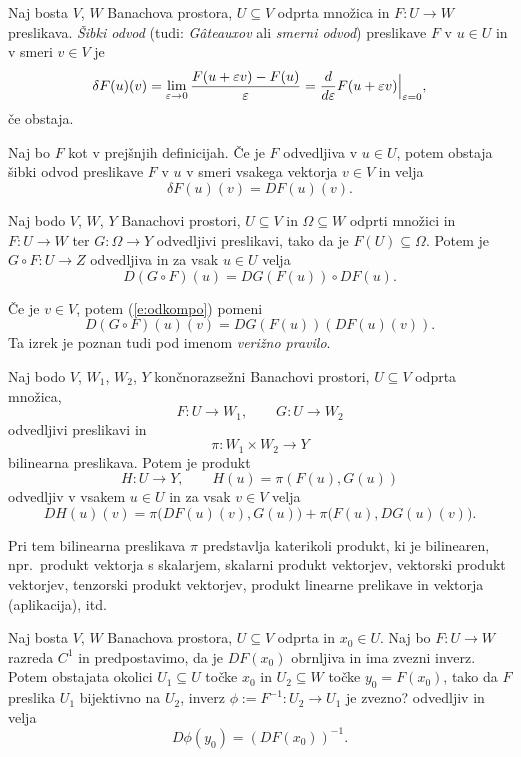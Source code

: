 \begin{definicija}
	Naj bosta $V$, $W$ Banachova prostora, $U\subseteq V$ odprta
	množica in $F\colon U\to W$ preslikava. \emph{Šibki odvod} (tudi: \emph{Gâteauxov} ali
	\emph{smerni odvod}) preslikave $F$ v $u\in U$ in v smeri $v\in V$ je
	\[
		\delta F(u)(v) =
		\lim_{\varepsilon\to 0}\frac{F(u+\varepsilon v)-F(u)}{\varepsilon}
		=\frac{d}{d\varepsilon}F(u+\varepsilon v)\Big|_{\varepsilon = 0},
	\]
	če obstaja.
\end{definicija}

\begin{trditev}
	Naj bo $F$ kot v prejšnjih definicijah. Če je $F$ odvedljiva v $u\in U$,
	potem obstaja šibki odvod preslikave $F$ v $u$ v smeri vsakega vektorja $v\in V$
	in velja
	\[
		\delta F(u)(v)=DF(u)(v).
	\]
\end{trditev}

\begin{izrek}
	Naj bodo $V$, $W$, $Y$ Banachovi prostori, $U\subseteq V$ in $\Omega\subseteq W$ odprti
	množici in $F\colon U\to W$ ter $G\colon\Omega\to Y$ odvedljivi preslikavi,
	tako da je $F(U)\subseteq\Omega$.
	Potem je $G\circ F\colon U\to Z$ odvedljiva in za vsak $u\in U$ velja
	\begin{equation} \label{e:odkompo}
		D(G\circ F)(u)=DG(F(u))\circ DF(u).
	\end{equation}
\end{izrek}
Če je $v\in V$, potem (\ref{e:odkompo}) pomeni
\[
	D(G\circ F)(u)(v)=DG(F(u))(DF(u)(v)).
\]
Ta izrek je poznan tudi pod imenom \emph{verižno pravilo}.

\begin{izrek}
	Naj bodo $V$, $W_1$, $W_2$, $Y$ \textcolor[rgb]{1,0,0}{končnorazsežni} Banachovi prostori,
	$U\subseteq V$ odprta množica,
	\[
		F\colon U\to W_1,\qquad G\colon U\to W_2
	\]
	odvedljivi preslikavi in
	\[ \pi\colon W_1\times W_2\to Y \]
	bilinearna preslikava. Potem je produkt
	\[
		H\colon U\to Y, \qquad H(u)=\pi(F(u),G(u))
	\]
	odvedljiv v vsakem $u\in U$ in za vsak $v\in V$ velja
	\[
		DH(u)(v)=\pi\big(DF(u)(v),G(u)\big)+\pi\big(F(u),DG(u)(v)\big).
	\]
\end{izrek}
Pri tem bilinearna preslikava $\pi$ predstavlja katerikoli produkt, ki je bilinearen,
npr.~produkt vektorja s skalarjem, skalarni produkt vektorjev, vektorski produkt vektorjev,
tenzorski produkt vektorjev, produkt linearne prelikave in vektorja (aplikacija), itd.

\begin{izrek}
	Naj bosta $V$, $W$ Banachova prostora, $U\subseteq V$ odprta in $x_0\in U$. Naj bo
	$F\colon U\to W$ razreda $C^1$ in predpostavimo, da je $DF(x_0)$ obrnljiva in
	ima zvezni inverz. Potem obstajata okolici $U_1\subseteq U$ točke $x_0$ in
	$U_2\subseteq W$ točke $y_0=F(x_0)$, tako da $F$ preslika $U_1$ bijektivno na
	$U_2$, inverz $\phi:=F^{-1}\colon U_2\to U_1$ je \textcolor[rgb]{1,0,0}{zvezno?} odvedljiv
	in velja
	\[ D\phi(y_0)=(DF(x_0))^{-1}. \]
\end{izrek}

